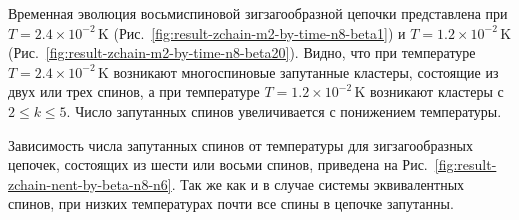 Временная эволюция восьмиспиновой зигзагообразной цепочки представлена при $T=2.4\times 10^{-2}\,\mbox{K}$ (Рис.~\ref{fig:result-zchain-m2-by-time-n8-beta1}) и $T=1.2\times 10^{-2}\,\mbox{K}$ (Рис.~\ref{fig:result-zchain-m2-by-time-n8-beta20}).  Видно, что при температуре $T=2.4\times 10^{-2}\,\mbox{K}$ возникают многоспиновые запутанные кластеры, состоящие из двух или трех спинов, а при температуре $T=1.2\times 10^{-2}\,\mbox{K}$ возникают кластеры с $2\leqslant k \leqslant 5$.
Число запутанных спинов увеличивается с понижением температуры.

Зависимость числа запутанных спинов от температуры для зигзагообразных цепочек,
состоящих из шести или восьми спинов, приведена на Рис.~\ref{fig:result-zchain-nent-by-beta-n8-n6}.
Так же как и в случае системы эквивалентных спинов,
при низких температурах почти все спины в цепочке запутанны.


%
%


